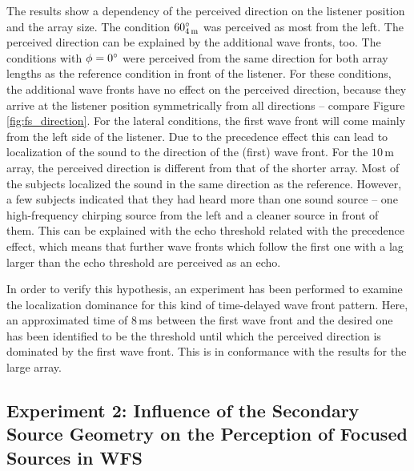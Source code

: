 The results show a dependency of the perceived direction on the listener
position and the array size. The condition $60^\circ_{4\,\text{m}}$ was perceived
as most from the left. The perceived direction can be explained by the
additional wave fronts, too.  The conditions with $\phi = 0^\circ$ were
perceived from the same direction for both array lengths as the reference
condition in front of the listener. For these conditions, the additional wave
fronts have no effect on the perceived direction, because they arrive at the
listener position symmetrically from all directions -- compare
Figure\,\ref{fig:fs_direction}. For the lateral conditions, the first wave front
will come mainly from the left side of the listener. Due to the precedence effect
this can lead to localization of the sound to the direction
of the (first) wave front.
For the $10$\,m array, the perceived direction is different from that of the
shorter array.  Most of the subjects localized the sound in the same direction
as the reference.  However, a few subjects indicated that they had heard more
than one sound source -- one high-frequency chirping source from the left and a
cleaner source in front of them. This can be explained with the echo threshold
related with the precedence effect, which means that further wave fronts which
follow the first one with a lag larger than the echo threshold are perceived as
an echo.\autocite[E.g.][]{Blauert1997}

In order to verify this hypothesis, an experiment has been performed to examine
the localization dominance for this kind of time-delayed wave front
pattern.\autocite{Wierstorf2010a} Here, an approximated time of $8$\,ms between the
first wave front and the desired one has been identified to be the threshold
until which the perceived direction is dominated by the first wave front. This
is in conformance with the results for the large array.




\subsection[Influence of the Secondary Source Geometry]{Experiment 2: Influence of the Secondary Source Geometry on the
Perception of Focused Sources in \ac{WFS}\autocite[Parts of this section are
published in][]{Wierstorf2013}}
\label{sec:fs_experiment2}


